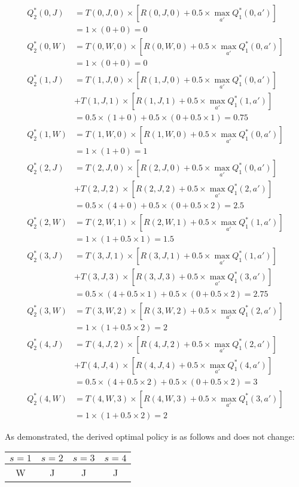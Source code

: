 \documentclass[11pt,fancychapters]{article}
\begin{document}
\begin{align*}
	Q_2^* (0, J) &= T(0, J, 0) \times [R(0, J, 0) + 0.5 \times \max_{a'}Q_1^*(0, a')] \\
	&= 1 \times (0 + 0) = 0 \\
	Q_2^* (0, W) &= T(0, W, 0) \times [R(0, W, 0) + 0.5 \times \max_{a'}Q_1^*(0, a')] \\
	&= 1 \times (0 + 0) = 0 \\
	Q_2^* (1, J) &= T(1, J, 0) \times [R(1, J, 0) + 0.5 \times \max_{a'}Q_1^*(0, a')] \\
	&+ T(1, J, 1) \times [R(1, J, 1) + 0.5 \times \max_{a'}Q_1^*(1, a')] \\
	&= 0.5 \times (1 + 0) + 0.5 \times (0 + 0.5 \times 1) = 0.75 \\
	Q_2^* (1, W) &= T(1, W, 0) \times [R(1, W, 0) + 0.5 \times \max_{a'}Q_1^*(0, a')] \\
	&= 1 \times (1 + 0) = 1 \\
	Q_2^* (2, J) &= T(2, J, 0) \times [R(2, J, 0) + 0.5 \times \max_{a'}Q_1^*(0, a')] \\
	&+ T(2, J, 2) \times [R(2, J, 2) + 0.5 \times \max_{a'}Q_1^*(2, a')] \\
	&= 0.5 \times (4 + 0) + 0.5 \times (0 + 0.5 \times 2) = 2.5 \\
	Q_2^* (2, W) &= T(2, W, 1) \times [R(2, W, 1) + 0.5 \times \max_{a'}Q_1^*(1, a')] \\
	&= 1 \times (1 + 0.5 \times 1) = 1.5 \\
	Q_2^* (3, J) &= T(3, J, 1) \times [R(3, J, 1) + 0.5 \times \max_{a'}Q_1^*(1, a')] \\
	&+ T(3, J, 3) \times [R(3, J, 3) + 0.5 \times \max_{a'}Q_1^*(3, a')] \\
	&= 0.5 \times (4 + 0.5 \times 1) + 0.5 \times (0 + 0.5 \times 2) = 2.75 \\
	Q_2^* (3, W) &= T(3, W, 2) \times [R(3, W, 2) + 0.5 \times \max_{a'}Q_1^*(2, a')] \\
	&= 1 \times (1 + 0.5 \times 2) = 2 \\
	Q_2^* (4, J) &= T(4, J, 2) \times [R(4, J, 2) + 0.5 \times \max_{a'}Q_1^*(2, a')] \\
	&+ T(4, J, 4) \times [R(4, J, 4) + 0.5 \times \max_{a'}Q_1^*(4, a')] \\
	&= 0.5 \times (4 + 0.5 \times 2) + 0.5 \times (0 + 0.5 \times 2) = 3 \\
	Q_2^* (4, W) &= T(4, W, 3) \times [R(4, W, 3) + 0.5 \times \max_{a'}Q_1^*(3, a')] \\
	&= 1 \times (1 + 0.5 \times 2) = 2
\end{align*}

As demonstrated, the derived optimal policy is as follows and does not change:

\begin{table}[h!]
	\centering
	\begin{tabular}{| c | c | c | c |} 
		\hline
		$s = 1$ & $s = 2$ & $s = 3$ & $s = 4$ \\
		\hline
		W & J & J & J \\
		\hline
	\end{tabular}
\end{table}
\end{document}
